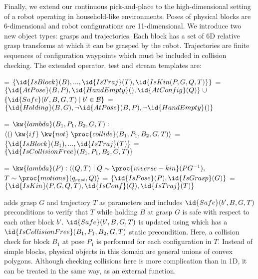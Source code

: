 \documentclass[letterpaper]{article} %
\theoremstyle{plain}\newtheorem{thm}{Theorem}
\theoremstyle{definition}\newtheorem{defn}{Definition}
\theoremstyle{plain}\newtheorem{lem}{Lemma}
\theoremstyle{plain}\newtheorem{cor}{Corollary}
\begin{document}
Finally, we extend our continuous pick-and-place to the
high-dimensional setting of a robot operating in household-like
environments.  Poses of physical blocks are 6-dimensional and robot
configurations are 11-dimensional.  We introduce two new object types:
grasps and trajectories.  Each block has a set of 6D relative grasp
transforms at 
which it can be grasped by the robot.  Trajectories are
finite sequences of configuration waypoints which must be included in
collision checking.
The extended  operator,  test and 
stream templates are:

\begin{footnotesize}
\begin{codebox}
\zi {} = $\{\id{IsBlock}(B), ..., \id{IsTraj}(T), \id{IsKin(P, G, Q, T)}\}$
\zi {} = $\{\id{AtPose}(B, P), \id{HandEmpty}(), \id{AtConfig}(Q)\} \;\cup$ \Indentmore
\zi $\{\id{Safe}(b', B, G, T) \mid b' \in {\cal B}\}$ \End
\zi {} = $\{\id{Holding}(B, G), \neg \id{AtPose}(B, P), \neg \id{HandEmpty}()\}$
\end{codebox}
\begin{codebox}
\zi {} = $\kw{lambda} (B_1, P_1, B_2, G, T):$ 
\zi \>\>\> $\langle () \;\kw{if} \;\kw{not}\; \proc{collide}(B_1, P_1, B_2, G, T) \rangle$
\zi {} = $\{\id{IsBlock}(B_1),...,  \id{IsTraj}(T)\}$
\zi {} = $\{\id{IsCollisionFree}(B_1, P_1, B_2, G, T)\}$
\end{codebox}
\begin{codebox}
\zi {} = $\kw{lambda} (P): \langle (Q, T) \mid Q \sim \proc{inverse-kin}(PG^{-1}), $\Indentmore
\zi $T \sim \proc{motions}(q_{rest}, Q) \rangle$ \End
\zi {} = $\{\id{IsPose}(P), \id{IsGrasp}(G)\}$
\zi {} = $\{\id{IsKin}(P, G, Q, T), \id{IsConf}(Q), \id{IsTraj}(T)\}$
\end{codebox}
\end{footnotesize}

 adds grasp $G$ and trajectory $T$ as parameters and includes
$\id{Safe}(b', B, G, T)$ preconditions to verify that $T$ while holding
$B$ at grasp $G$ is safe with respect to each other block $b'$.
$\id{Safe}(b', B, G, T)$ is updated using  which has a
$\id{IsCollisionFree}(B_1, P_1, B_2, G, T)$ static precondition.
Here, a collision check for block $B_1$ at pose $P_1$ is performed for
each configuration in $T$. Instead of simple
blocks, physical objects in this domain are general unions of convex
polygons. Although checking collisions here is more
complication than in 1D, it can be treated in the same way, as an
external function.
\end{document}
